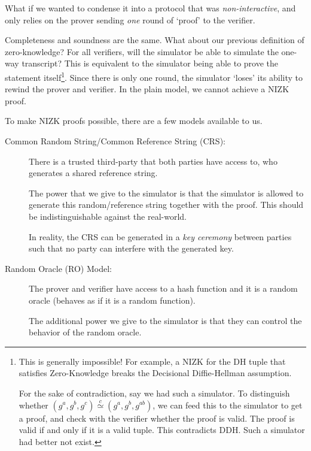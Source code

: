 What if we wanted to condense it into a protocol that was \emph{non-interactive}, and only relies on the prover sending \emph{one} round of `proof' to the verifier.


Completeness and soundness are the same. What about our previous definition of zero-knowledge? For all verifiers, will the simulator be able to simulate the one-way transcript? This is equivalent to the simulator being able to prove the statement itself\footnote{This is generally impossible! For example, a NIZK for the DH tuple that satisfies Zero-Knowledge breaks the Decisional Diffie-Hellman assumption.

    For the sake of contradiction, say we had such a simulator. To distinguish whether $(g^a, g^b, g^c)\overset{c}{\simeq}(g^a, g^b, g^{ab})$, we can feed this to the simulator to get a proof, and check with the verifier whether the proof is valid. The proof is valid if and only if it is a valid tuple. This contradicts DDH. Such a simulator had better not exist. }. Since there is only one round, the simulator `loses' its ability to rewind the prover and verifier. In the plain model, we cannot achieve a NIZK proof.

To make NIZK proofs possible, there are a few models available to us.

\begin{mdframed}[style=mdgreenbox]
    \begin{description}
        \item[Common Random String/Common Reference String (CRS):] There is a trusted third-party that both parties have access to, who generates a shared reference string.

            The power that we give to the simulator is that the simulator is allowed to generate this random/reference string together with the proof. This should be indistinguishable against the real-world.

            In reality, the CRS can be generated in a \emph{key ceremony} between parties such that no party can interfere with the generated key.
    \end{description}
\end{mdframed}

\begin{mdframed}[style=mdgreenbox]
    \begin{description}
        \item[Random Oracle (RO) Model:] The prover and verifier have access to a hash function and it is a random oracle (behaves as if it is a random function).

            The additional power we give to the simulator is that they can control the behavior of the random oracle.
    \end{description}
\end{mdframed}

